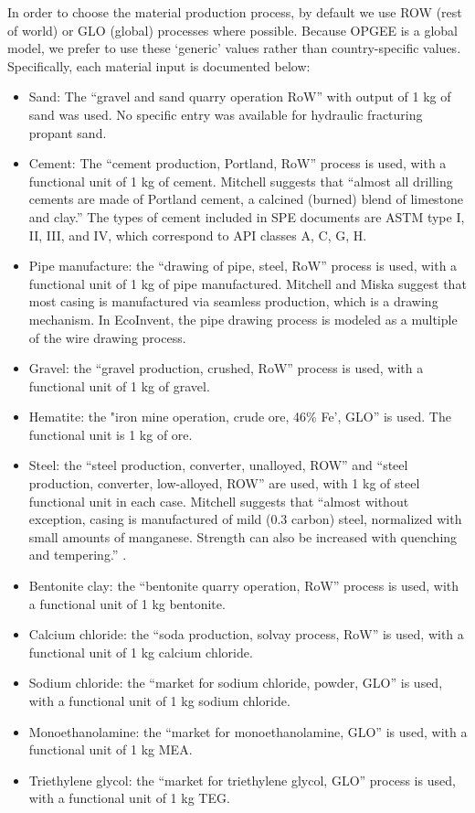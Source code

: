 \documentclass[11pt]{report}
\begin{document}
In order to choose the material production process, by default we use ROW (rest of world) or GLO (global) processes where possible. Because OPGEE is a global model, we prefer to use these `generic' values rather than country-specific values. Specifically, each material input is documented below:
\begin{itemize}
\item Sand: The ``gravel and sand quarry operation RoW'' with output of 1 kg of sand was used. No specific entry was available for hydraulic fracturing propant sand.
\item Cement: The ``cement production, Portland, RoW'' process is used, with a functional unit of 1 kg of cement. Mitchell suggests \cite[p. 382]{Mitchell2006} that ``almost all drilling cements are made of Portland cement, a calcined (burned) blend of limestone and clay.'' The types of cement included in SPE documents are ASTM type I, II, III, and IV, which correspond to API classes A, C, G, H.
\item Pipe manufacture: the ``drawing of pipe, steel, RoW'' process is used, with a functional unit of 1 kg of pipe manufactured. Mitchell and Miska \cite[p. 387]{Mitchell2011} suggest that most casing is manufactured via seamless production, which is a drawing mechanism. In EcoInvent, the pipe drawing process is modeled as a multiple of the wire drawing process.
\item Gravel: the ``gravel production, crushed, RoW'' process is used, with a functional unit of 1 kg of gravel.
\item Hematite: the "iron mine operation, crude ore, 46\% Fe', GLO'' is used. The functional unit is 1 kg of ore.
\item Steel: the ``steel production, converter, unalloyed, ROW'' and ``steel production, converter, low-alloyed, ROW'' are used, with 1 kg of steel functional unit in each case. Mitchell suggests that ``almost without exception, casing is manufactured of mild (0.3 carbon) steel, normalized with small amounts of manganese. Strength can also be increased with quenching and tempering.'' \cite[p. 288]{Mitchell2006}.
\item Bentonite clay: the ``bentonite quarry operation, RoW'' process is used, with a functional unit of 1 kg bentonite.
\item Calcium chloride: the ``soda production, solvay process, RoW'' is used, with a functional unit of 1 kg calcium chloride.
\item Sodium chloride: the ``market for sodium chloride, powder, GLO'' is used, with a functional unit of 1 kg sodium chloride.
\item Monoethanolamine: the ``market for monoethanolamine, GLO'' is used, with a functional unit of 1 kg MEA.
\item Triethylene glycol: the ``market for triethylene glycol, GLO'' process is used, with a functional unit of 1 kg TEG.
\end{itemize}
\end{document}
